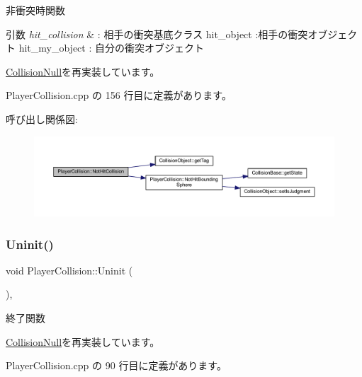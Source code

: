 非衝突時関数 


\begin{DoxyParams}{引数}
{\em hit\+\_\+collision} & \+: 相手の衝突基底クラス hit\+\_\+object \+:相手の衝突オブジェクト hit\+\_\+my\+\_\+object \+: 自分の衝突オブジェクト \\
\hline
\end{DoxyParams}


\mbox{\hyperlink{class_collision_null_aba2a574ab42dca618c41dd0b9562f614}{Collision\+Null}}を再実装しています。



 Player\+Collision.\+cpp の 156 行目に定義があります。

呼び出し関係図\+:\nopagebreak
\begin{figure}[H]
\begin{center}
\leavevmode
\includegraphics[width=350pt]{class_player_collision_a21b8f825ea142024212ab5fe3f427ab0_cgraph}
\end{center}
\end{figure}
\mbox{\label{class_player_collision_aa1ab60a62fa2ae3231a1ea0bc8faf801}} 
\subsubsection{\texorpdfstring{Uninit()}{Uninit()}}
{\footnotesize\ttfamily void Player\+Collision\+::\+Uninit (\begin{DoxyParamCaption}{ }\end{DoxyParamCaption})\hspace{0.3cm}{\ttfamily [override]}, {\ttfamily [virtual]}}



終了関数 



\mbox{\hyperlink{class_collision_null_a7c6d0ec502efc55e2f406415451152f5}{Collision\+Null}}を再実装しています。



 Player\+Collision.\+cpp の 90 行目に定義があります。

